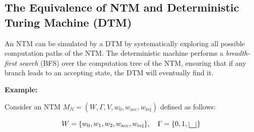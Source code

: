 \documentclass[12pt,a4paper,openany]{article}
\begin{document}
\begin{center}
\begin{minipage}{0.45\textwidth}
  \centering
\end{minipage}
\begin{minipage}{0.45\textwidth}
  \centering
\end{minipage}
\end{center}

\subsection{The Equivalence of NTM and Deterministic Turing Machine (DTM)}

An NTM can be simulated by a DTM by systematically exploring all possible computation
paths of the NTM. The deterministic machine performs a \emph{breadth-first
search} (BFS) over the computation tree of the NTM, ensuring that if any
branch leads to an accepting state, the DTM will eventually find it.

\textbf{Example:}

Consider an NTM $M_N = (W, \Gamma, V, w_0, w_{\text{acc}}, w_{\text{rej}})$
defined as follows:

\[
W = \{w_0, w_1, w_2, w_{\text{acc}}, w_{\text{rej}}\}, \quad
\Gamma = \{0, 1, \scalebox{2.5}{\textvisiblespace}\}
\]
\end{document}
